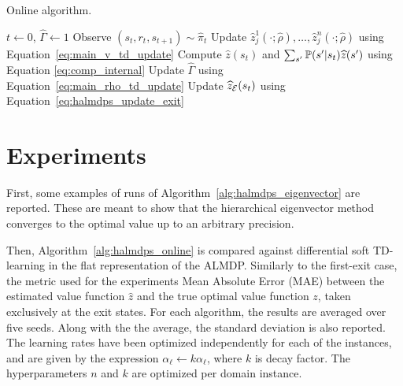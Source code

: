\begin{algorithm}[!htpb]
  \caption{Online algorithm.}
  \begin{algorithmic}[1]
    \State $t \gets 0$, $\widehat{\Gamma} \gets 1$
    \State Observe $(s_{t}, r_{t}, s_{t+1})\sim\widehat\pi_t$
    \State Update $\widehat z_j^1(\cdot;\widehat\rho),\ldots,\widehat z_j^n(\cdot;\widehat\rho)$ using Equation~\eqref{eq:main_v_td_update}
    \State Compute $\widehat z(s_t)$ and $\sum_{s'}\mathbb{P}(s'|s_t)\widehat z(s')$ using Equation \eqref{eq:comp_internal}
    \State Update $\widehat\Gamma$ using Equation~\eqref{eq:main_rho_td_update}
    \State Update $\widehat z_{\mathcal{E}}(s_t)$ using Equation~\eqref{eq:halmdps_update_exit}
    \EndIf
    \EndWhile
  \end{algorithmic}
  \label{alg:halmdps_online}
\end{algorithm}

\section{Experiments}

First, some examples of runs of Algorithm~\ref{alg:halmdps_eigenvector} are reported. These are meant to show that the hierarchical eigenvector method converges to the optimal value up to an arbitrary precision.

Then, Algorithm~\ref{alg:halmdps_online} is compared against differential soft TD-learning in the flat representation of the ALMDP. Similarly to the first-exit case, the metric used for the experiments Mean Absolute Error (MAE) between the estimated value function $\widehat z$ and the true optimal value function $z$, taken exclusively at the exit states. For each algorithm, the results are averaged over five seeds. Along with the the average, the standard deviation is also reported. The learning rates have been optimized independently for each of the instances, and are given by the expression $\alpha_\ell \leftarrow k \alpha_\ell$, where $k$ is decay factor. The hyperparameters $n$ and $k$ are optimized per domain instance.

